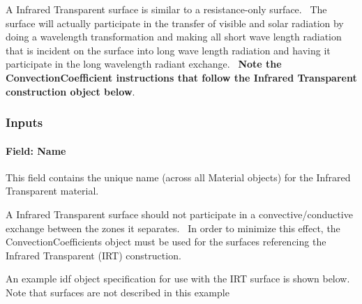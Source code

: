 A Infrared Transparent surface is similar to a resistance-only surface.~ The surface will actually participate in the transfer of visible and solar radiation by doing a wavelength transformation and making all short wave length radiation that is incident on the surface into long wave length radiation and having it participate in the long wavelength radiant exchange.~ \textbf{Note the ConvectionCoefficient instructions that follow the Infrared Transparent construction object below}.

\subsubsection{Inputs}\label{inputs-2-040}

\paragraph{Field: Name}\label{field-name-2-037}

This field contains the unique name (across all Material objects) for the Infrared Transparent material.

A Infrared Transparent surface should not participate in a convective/conductive exchange between the zones it separates.~ In order to minimize this effect, the ConvectionCoefficients object must be used for the surfaces referencing the Infrared Transparent (IRT) construction.

An example idf object specification for use with the IRT surface is shown below. Note that surfaces are not described in this example

